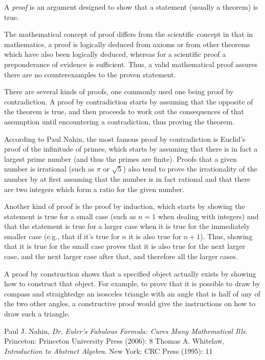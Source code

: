 \documentclass[12pt]{article}
\begin{document}
A {\em proof} is an argument designed to show that a statement (usually a theorem) is true.

The mathematical concept of proof differs from the scientific concept in that in mathematics, a proof is logically deduced from axioms or from other theorems which have also been logically deduced, whereas for a scientific proof a preponderance of evidence is sufficient. Thus, a valid mathematical proof assures there are no counterexamples to the proven statement.

There are several kinds of proofs, one commonly used one being proof by contradiction. A proof by contradiction starts by assuming that the opposite of the theorem is true, and then proceeds to work out the consequences of that assumption until encountering a contradiction, thus proving the theorem.

According to Paul Nahin, the most famous proof by contradiction is Euclid's proof of the infinitude of primes, which starts by assuming that there is in fact a largest prime number (and thus the primes are finite). Proofs that a given number is irrational (such as $\pi$ or $\sqrt{5}$) also tend to prove the irrationality of the number by at first assuming that the number is in fact rational and that there are two integers which form a ratio for the given number.

Another kind of proof is the proof by induction, which starts by showing the statement is true for a small case (such as $n = 1$ when dealing with integers) and that the statement is true for a larger case when it is true for the immediately smaller case (e.g., that if it's true for $n$ it is also true for $n + 1$). Thus, showing that it is true for the small case proves that it is also true for the next larger case, and the next larger case after that, and therefore all the larger cases.

A proof by construction shows that a specified object actually exists by showing how to construct that object. For example, to prove that it is possible to draw by compass and straightedge an isosceles triangle with an angle that is half of any of the two other angles, a constructive proof would give the instructions on how to draw such a triangle.

\begin{thebibliography}{3}
 Paul J. Nahin, {\it Dr. Euler's Fabulous Formula: Cures Many Mathematical Ills}. Princeton: Princeton University Press (2006): 8
 Thomas A. Whitelaw, {\it Introduction to Abstract Algebra}. New York: CRC Press (1995): 11
\end{thebibliography}
\end{document}
